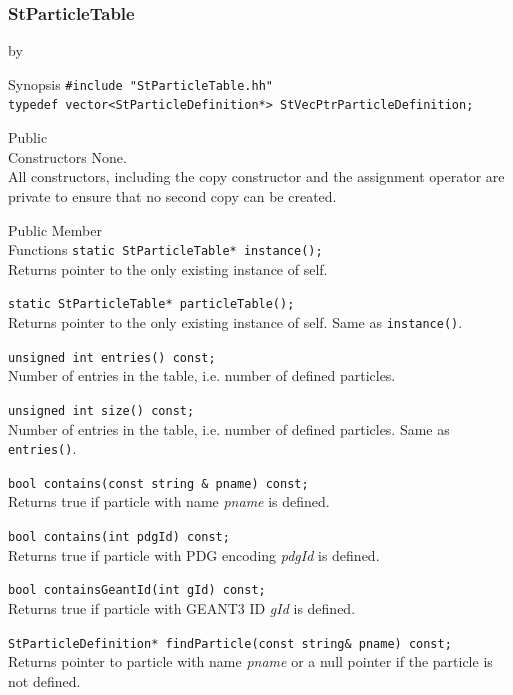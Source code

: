 \documentclass[twoside]{article}
\newcommand{\comp}[1]{\texttt{#1}}%
\newcommand{\args}[1]{\textit{#1}}%
\newcommand{\entrylabel}[1]{\mbox{\textbf{{#1}}}\hfil}%
\newenvironment{entry}
{\begin{list}{}%
    {\renewcommand{\makelabel}{\entrylabel}%
     \setlength{\labelwidth}{90pt}%
     \setlength{\leftmargin}{\labelwidth}
     \advance\leftmargin by \labelsep%
      }%
    }%
  {\end{list}}
\newcommand{\Entrylabel}[1]%
{\raisebox{0pt}[1ex][0pt]{\makebox[\labelwidth][l]%
    {\parbox[t]{\labelwidth}{\hspace{0pt}\textbf{{#1}}}}}}
\newenvironment{Entry}%
{\renewcommand{\entrylabel}{\Entrylabel}\begin{entry}}%
  {\end{entry}}
\begin{document}
\begin{description}
\subsubsection{StParticleTable}
\begin{Entry}
\item[Synopsis]
    \verb+#include "StParticleTable.hh"+\\    
    \verb+typedef vector<StParticleDefinition*> StVecPtrParticleDefinition;+\\  
    
\item[Public\\ Constructors]
    None.\\
    All constructors, including the copy constructor
    and the assignment operator are private to ensure that
    no second copy can be created.
    
\item[Public Member\\ Functions]
    \verb+static StParticleTable* instance();+\\ 
    Returns pointer to the only existing instance of self.

    \verb+static StParticleTable* particleTable();+\\
    Returns pointer to the only existing instance of self.
    Same as \comp{instance()}.
    
    \verb+unsigned int entries() const;+\\
    Number of entries in the table, i.e. number of
    defined particles.
    
    \verb+unsigned int size() const;+\\ 
    Number of entries in the table, i.e. number of
    defined particles. Same as \comp{entries()}.
    
    \verb+bool contains(const string & pname) const;  +\\
    Returns true if particle with name \args{pname} is defined.
    
    \verb+bool contains(int pdgId) const;   +\\           
    Returns true if particle with PDG encoding \args{pdgId} is defined.
    
    \verb+bool containsGeantId(int gId) const; +\\      
    Returns true if particle with GEANT3 ID \args{gId} is defined.
    
    \verb+StParticleDefinition* findParticle(const string& pname) const;+\\
    Returns pointer to particle with name \args{pname} or a null
    pointer if the particle is not defined.
    

\end{Entry}
\end{description}
\end{document}
